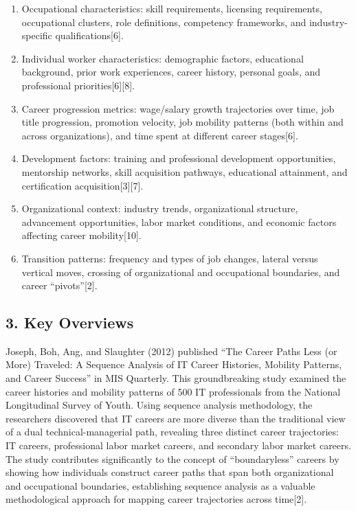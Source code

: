 \documentclass[
  letterpaper,
  DIV=11,
  numbers=noendperiod]{scrartcl}
\begin{document}
\begin{enumerate}
\def\labelenumi{\arabic{enumi}.}
\item
  Occupational characteristics: skill requirements, licensing
  requirements, occupational clusters, role definitions, competency
  frameworks, and industry-specific qualifications{[}6{]}.
\item
  Individual worker characteristics: demographic factors, educational
  background, prior work experiences, career history, personal goals,
  and professional priorities{[}6{]}{[}8{]}.
\item
  Career progression metrics: wage/salary growth trajectories over time,
  job title progression, promotion velocity, job mobility patterns (both
  within and across organizations), and time spent at different career
  stages{[}6{]}.
\item
  Development factors: training and professional development
  opportunities, mentorship networks, skill acquisition pathways,
  educational attainment, and certification acquisition{[}3{]}{[}7{]}.
\item
  Organizational context: industry trends, organizational structure,
  advancement opportunities, labor market conditions, and economic
  factors affecting career mobility{[}10{]}.
\item
  Transition patterns: frequency and types of job changes, lateral
  versus vertical moves, crossing of organizational and occupational
  boundaries, and career ``pivots''{[}2{]}.
\end{enumerate}

\subsection{3. Key Overviews}\label{key-overviews}

Joseph, Boh, Ang, and Slaughter (2012) published ``The Career Paths Less
(or More) Traveled: A Sequence Analysis of IT Career Histories, Mobility
Patterns, and Career Success'' in MIS Quarterly. This groundbreaking
study examined the career histories and mobility patterns of 500 IT
professionals from the National Longitudinal Survey of Youth. Using
sequence analysis methodology, the researchers discovered that IT
careers are more diverse than the traditional view of a dual
technical-managerial path, revealing three distinct career trajectories:
IT careers, professional labor market careers, and secondary labor
market careers. The study contributes significantly to the concept of
``boundaryless'' careers by showing how individuals construct career
paths that span both organizational and occupational boundaries,
establishing sequence analysis as a valuable methodological approach for
mapping career trajectories across time{[}2{]}.
\end{document}
